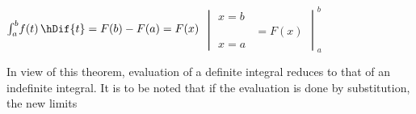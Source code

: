 \documentclass[11pt]{amsbook}
\begin{document}
\begin{notation}
		 $\int_{a}^{b} \! f(t) \, \hDif{t} = F(b) - F(a) = F(x)$
		$\begin{vmatrix}
			x = b\\
			& = F(x)\\
			x = a 
		\end{vmatrix}_{a}^{b}$
\end{notation}

In view of this theorem, evaluation of a definite integral reduces to that of an indefinite integral. 
It is to be noted that if the evaluation is done by substitution, the new limits

\end{document}
